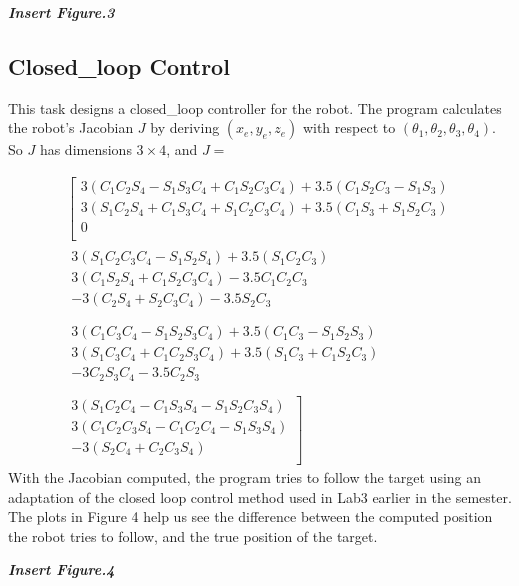 \documentclass{article}
\begin{document}
\textbf{\textit{Insert Figure.3}}

\subsection{Closed\_loop Control}
This task designs a closed\_loop controller for the robot. The program calculates the robot's Jacobian $J$ by deriving $(x_e, y_e, z_e)$ with respect to $(\theta_1, \theta_2, \theta_3, \theta_4)$. So $J$ has dimensions $3\times4$, and $J =$

\begin{multline}
 \left[
      \begin{matrix}
        3(C_1C_2S_4 - S_1S_3C_4 + C_1S_2C_3C_4) + 3.5(C_1S_2C_3 - S_1S_3)\\ 
        3(S_1C_2S_4 + C_1S_3C_4 + S_1C_2C_3C_4) + 3.5(C_1S_3 + S_1S_2C_3)\\ 
        0\\
      \end{matrix}\right.                
    \\
    \begin{matrix}
        3(S_1C_2C_3C_4 - S_1S_2S_4) + 3.5(S_1C_2C_3)\\ 
        3(C_1S_2S_4 + C_1S_2C_3C_4) - 3.5C_1C_2C_3\\ 
        -3(C_2S_4 + S_2C_3C_4) -3.5S_2C_3\\
      \end{matrix}
      \\
      \begin{matrix}
        3(C_1C_3C_4 - S_1S_2S_3C_4) + 3.5(C_1C_3 - S_1S_2S_3)\\ 
        3(S_1C_3C_4 + C_1C_2S_3C_4) + 3.5(S_1C_3 + C_1S_2C_3)\\ 
        -3C_2S_3C_4 -3.5C_2S_3\\
      \end{matrix}
      \\
      \left.
      \begin{matrix}
        3(S_1C_2C_4 - C_1S_3S_4 - S_1S_2C_3S_4)\\ 
        3(C_1C_2C_3S_4 - C_1C_2C_4 - S_1S_3S_4)\\ 
        -3(S_2C_4 + C_2C_3S_4)\\
      \end{matrix}\right]
\end{multline}
With the Jacobian computed, the program tries to follow the target using an adaptation of the closed loop control method used in Lab3 earlier in the semester. The plots in Figure 4 help us see the difference between the computed position the robot tries to follow, and the true position of the target. 

\textbf{\textit{Insert Figure.4}}
\end{document}
